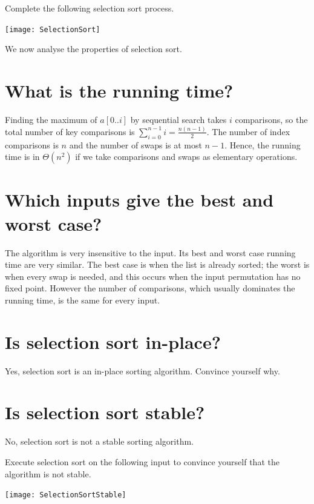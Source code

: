 \begin{Boxample}[0]
Complete the following selection sort process.
\begin{center}
\texttt{[image: SelectionSort]}
\end{center}
\end{Boxample}

We now analyse the properties of selection sort.

\section{What is the running time?}
Finding the maximum of $a[0..i]$ by sequential search takes $i$ comparisons,
so the total number of key comparisons is $\sum_{i=0}^{n-1} i  = \frac{n(n - 1)}{2}$.
The number of index comparisons is $n$ and the number of swaps is at most $n - 1$.
Hence, the running time is in $\Theta(n^2)$ if we take comparisons and swaps as elementary operations.

\section{Which inputs give the best and worst case?}
The algorithm is very insensitive to the input. 
Its best and worst case running time are very similar. 
The best case is when the list is already sorted; the worst is when every swap is needed, 
and this occurs when the input permutation has no fixed point. 
However the number of comparisons, which usually dominates the running time, is the same for every input.

\section{Is selection sort in-place?}
Yes, selection sort is an in-place sorting algorithm. Convince yourself why.

\section{Is selection sort stable?}
No, selection sort is not a stable sorting algorithm.
\begin{Boxample}[0]
Execute selection sort on the following input to convince yourself that the algorithm is not stable.
\begin{center}
\texttt{[image: SelectionSortStable]} 
\end{center}
\end{Boxample}

